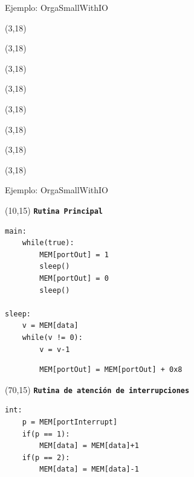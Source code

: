 \documentclass[aspectratio=169]{beamer}
\begin{document}
\begin{frame}[fragile,t]{Ejemplo: OrgaSmallWithIO}
    \begin{textblock}{70}(3,18)  \end{textblock}
    \begin{textblock}{70}(3,18)  \end{textblock} %
    \begin{textblock}{70}(3,18)  \end{textblock} %
    \begin{textblock}{70}(3,18)  \end{textblock} %
    \begin{textblock}{70}(3,18)  \end{textblock} %
    \begin{textblock}{70}(3,18)  \end{textblock} %
    \begin{textblock}{70}(3,18)  \end{textblock} %
    \begin{textblock}{70}(3,18)  \end{textblock} %
\end{frame}

\begin{frame}[fragile,t]{Ejemplo: OrgaSmallWithIO}
\begin{textblock}{70}(10,15)
\textcolor{naranjauca}{\textbf{\texttt{Rutina Principal}}}
\scriptsize
\begin{verbatim}
main:
    while(true):
        MEM[portOut] = 1
        sleep()
        MEM[portOut] = 0
        sleep()
        
sleep:
    v = MEM[data]
    while(v != 0):
        v = v-1
\end{verbatim}
\vspace{-0.6cm}
{ \color{red}
\begin{verbatim}
        MEM[portOut] = MEM[portOut] + 0x8
\end{verbatim}
}
\end{textblock}

\begin{textblock}{70}(70,15)
\textcolor{naranjauca}{\textbf{\texttt{Rutina de atención de interrupciones}}}
\scriptsize
\begin{verbatim}
int:
    p = MEM[portInterrupt]
    if(p == 1):
        MEM[data] = MEM[data]+1
    if(p == 2):
        MEM[data] = MEM[data]-1
\end{verbatim}
\end{textblock}

\end{frame}
\end{document}
